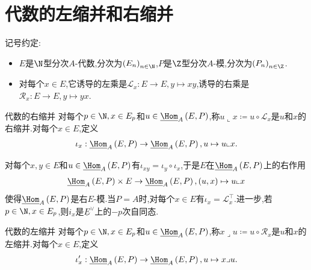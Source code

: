 \section{代数的左缩并和右缩并}

记号约定:
\begin{itemize}
	\item $E$是$\N$型分次$A$-代数,分次为$\left(E_{n}\right)_{n\in\N}$,$P$是$\Z$型分次$A$-模,分次为$\left(P_{n}\right)_{n\in\Z}$.
	\item 对每个$x\in E$,它诱导的左乘是$\mathcal{L}_{x}:E\to E,y\mapsto xy$,诱导的右乘是$\mathcal{R}_{x}:E\to E,y\mapsto yx$.
\end{itemize}

\begin{definition}{代数的右缩并}{}
	对每个$p\in\N,x\in E_{p}$和$u\in\underline{\Hom}_{A}\left(E,P\right)$,称$u\llcorner x\coloneq u\circ\mathcal{L}_{x}$是$u$和$x$的右缩并.对每个$x\in E$,定义
	\begin{align*}
		\iota_{x}:\underline{\Hom}_{A}\left(E,P\right)\to\underline{\Hom}_{A}\left(E,P\right),u\mapsto u\llcorner x.
	\end{align*}
\end{definition}

\begin{remark}{}{}
	对每个$x,y\in E$和$u\in\underline{\Hom}_{A}\left(E,P\right)$有$\iota_{xy}=\iota_{y}\circ\iota_{x}$,于是$E$在$\underline{\Hom}_{A}\left(E,P\right)$上的右作用
	\begin{align*}
		\underline{\Hom}_{A}\left(E,P\right)\times E\to\underline{\Hom}_{A}\left(E,P\right),\left(u,x\right)\mapsto u\llcorner x
	\end{align*}
	使得$\underline{\Hom}_{A}\left(E,P\right)$是右$E$-模.当$P=A$时,对每个$x\in E$有$\iota_{x}=\mathcal{L}_{x}^{\top}$.进一步,若$p\in\N,x\in E_{p}$,则$i_{x}$是$\underline{E}^{\vee}$上的$-p$次自同态.
\end{remark}

\begin{definition}{代数的左缩并}{}
	对每个$p\in\N,x\in E_{p}$和$u\in\underline{\Hom}_{A}\left(E,P\right)$,称$x\lrcorner u\coloneq u\circ\mathcal{R}_{x}$是$u$和$x$的左缩并.对每个$x\in E$,定义
	\begin{align*}
		\iota_{x}^{\prime}:\underline{\Hom}_{A}\left(E,P\right)\to\underline{\Hom}_{A}\left(E,P\right),u\mapsto x\lrcorner u.
	\end{align*}
\end{definition}

